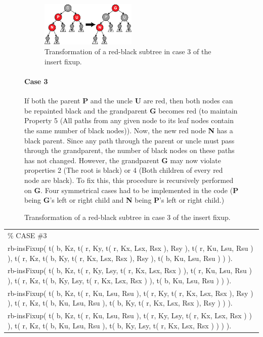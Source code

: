 \documentclass{article}
\newenvironment{code}{\obeycr\begin{it}\nopagebreak\addvspace{1ex}\noindent\footnotesize\begin{tabular}{|p{0.95\textwidth}|}\hline}{\\\hline\end{tabular}\par\addvspace{1ex}\end{it}\restorecr}
\begin{document}
\begin{figure}[h]
\begin{figure}
  \includegraphics[width=0.5\textwidth]{Red-black_tree_insert_case_3}
  \caption{Transformation of a red-black subtree in case 3 of the insert fixup.}
  \label{insFix3}
\end{figure}
\paragraph{Case 3}
If both the parent \textbf{P} and the uncle \textbf{U} are red, then both nodes can be repainted black and the grandparent \textbf{G} becomes red (to maintain Property 5 (All paths from any given node to its leaf nodes contain the same number of black nodes)). Now, the new red node \textbf{N} has a black parent. Since any path through the parent or uncle must pass through the grandparent, the number of black nodes on these paths has not changed. However, the grandparent \textbf{G} may now violate properties 2 (The root is black) or 4 (Both children of every red node are black). To fix this, this procedure is recursively performed on \textbf{G}.
Four symmetrical cases had to be implemented in the code (\textbf{P} being \textbf{G}'s left or right child and \textbf{N} being \textbf{P}'s left or right child.)
\end{figure}

\begin{code}
\% CASE \#3\\
rb-insFixup( t( b, Kz, t( r, Ky, t( r, Kx, Lsx, Rsx ), Rsy ), t( r, Ku, Lsu, Rsu ) ), t( r, Kz, t( b, Ky, t( r, Kx, Lsx, Rsx ), Rsy ), t( b, Ku, Lsu, Rsu ) ) ).\\
rb-insFixup( t( b, Kz, t( r, Ky, Lsy, t( r, Kx, Lsx, Rsx ) ), t( r, Ku, Lsu, Rsu ) ), t( r, Kz, t( b, Ky, Lsy, t( r, Kx, Lsx, Rsx ) ), t( b, Ku, Lsu, Rsu ) ) ).\\
rb-insFixup( t( b, Kz, t( r, Ku, Lsu, Rsu ), t( r, Ky, t( r, Kx, Lsx, Rsx ), Rsy ) ), t( r, Kz, t( b, Ku, Lsu, Rsu ), t( b, Ky, t( r, Kx, Lsx, Rsx ), Rsy ) ) ).\\
rb-insFixup( t( b, Kz, t( r, Ku, Lsu, Rsu ), t( r, Ky, Lsy, t( r, Kx, Lsx, Rsx ) ) ), t( r, Kz, t( b, Ku, Lsu, Rsu ), t( b, Ky, Lsy, t( r, Kx, Lsx, Rsx ) ) ) ).
\end{code}
\end{document}

